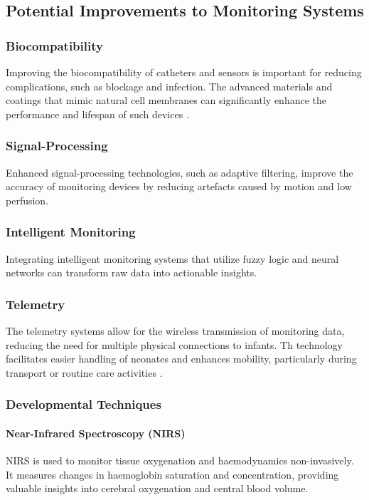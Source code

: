 \documentclass[12pt,journal,compsoc]{IEEEtran}
\begin{document}
\subsection{Potential Improvements to Monitoring Systems}

\subsubsection{Biocompatibility}
Improving the biocompatibility of catheters and sensors is important for reducing complications, such as blockage and infection. The advanced materials and coatings that mimic natural cell membranes can significantly enhance the performance and lifespan of such devices \cite{IEEEhowto:nicklin}.

\subsubsection{Signal-Processing}
Enhanced signal-processing technologies, such as adaptive filtering, improve the accuracy of monitoring devices by reducing artefacts caused by motion and low perfusion.  

\subsubsection{Intelligent Monitoring}
Integrating intelligent monitoring systems that utilize fuzzy logic and neural networks can transform raw data into actionable insights.  

\subsubsection{Telemetry}
The telemetry systems allow for the wireless transmission of monitoring data, reducing the need for multiple physical connections to infants. Th technology facilitates easier handling of neonates and enhances mobility, particularly during transport or routine care activities \cite{IEEEhowto:nicklin}.

\subsubsection{Developmental Techniques}

\paragraph{Near-Infrared Spectroscopy (NIRS)}
NIRS is used to monitor tissue oxygenation and haemodynamics non-invasively. It measures changes in haemoglobin saturation and concentration, providing valuable insights into cerebral oxygenation and central blood volume. 
\end{document}
